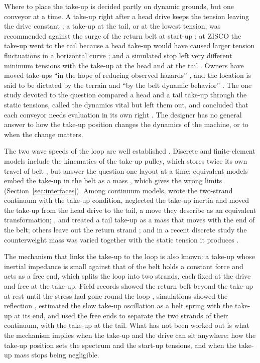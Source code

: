 Where to place the take-up is decided partly on dynamic grounds, but one conveyor at a time. A
take-up right after a head drive keeps the tension leaving the drive constant
\citep{lodewijks2013}; a take-up at the tail, or at the lowest tension, was recommended against
the surge of the return belt at start-up \citep{harrison1985b}; at ZISCO the take-up went to the
tail because a head take-up would have caused larger tension fluctuations in a horizontal curve
\citep{nordell1997zisco}; and a simulated stop left very different minimum tensions with the
take-up at the head and at the tail \citep{cdi2002}. Owners have moved take-ups ``in the hope of reducing observed hazards''
\citep{nordell1987}, and the location is said to be dictated by the terrain and ``by the belt
dynamic behavior'' \citep{cornet2002}. The one study devoted to the question compared a head
and a tail take-up through the static tensions, called the dynamics vital but left them out,
and concluded that each conveyor needs evaluation in its own right \citep{harrison1989}. The
designer has no general answer to how the take-up position changes the dynamics of the
machine, or to when the change matters.

The two wave speeds of the loop are well established \citep{nordell1984,lodewijks2002,cdi1998}.
Discrete and finite-element models include the kinematics of the take-up pulley, which stores
twice its own travel of belt \citep{lodewijks1996,kulinowski2014,song2003}, but answer the
question one layout at a time; equivalent models embed the take-up in the belt as a mass
\citep{harrison1983,sakharwade2019}, which gives the wrong limits
(Section~\ref{sec:interfaces}). Among continuum models, \citet{song2012} wrote the two-strand
continuum with the take-up condition, neglected the take-up inertia and moved the take-up from
the head drive to the tail, a move they describe as an equivalent transformation;
\citet{zhang1999}, \citet{pang2015} and \citet{li2018} treated a tail take-up as a mass that
moves with the end of the belt; others leave out the return strand
\citep{ellis1987,pihnastyi2020}; and in a recent discrete study the counterweight mass was
varied together with the static tension it produces \citep{gao2026}.

The mechanism that links the take-up to the loop is also known: a take-up whose inertial
impedance is small against that of the belt holds a constant force and acts as a free end, which
splits the loop into two strands, each fixed at the drive and free at the take-up. Field records
showed the return belt beyond the take-up at rest until the stress had gone round the
loop \citep{harrison1985b}, simulations showed the reflection \citep{morrison1987,nordell1987},
\citet{harrison1983} estimated the slow take-up oscillation as a belt spring with the take-up
at its end, and \citet{song2012} used the free ends to separate the two strands of their
continuum, with the take-up at the tail. What has not been worked out is what the mechanism implies when the
take-up and the drive can sit anywhere: how the take-up position sets the spectrum and the
start-up tensions, and when the take-up mass stops being negligible.

